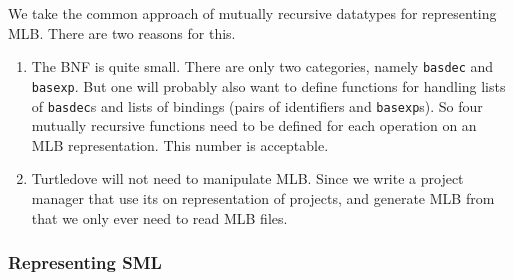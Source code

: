 We take the common approach of mutually recursive datatypes for representing
MLB. There are two reasons for this.
\begin{enumerate}
\item The BNF is quite small. There are only two categories, namely
      \texttt{basdec} and \texttt{basexp}. But one will probably also want to
      define functions for handling lists of \texttt{basdec}s and lists of
      bindings (pairs of identifiers and \texttt{basexp}s). So four mutually
      recursive functions need to be defined for each operation on an MLB
      representation. This number is acceptable.
\item Turtledove will not need to manipulate MLB. Since we write a project
      manager that use its on representation of projects, and generate MLB from
      that we only ever need to read MLB files.
\end{enumerate}

\subsubsection{Representing SML}

